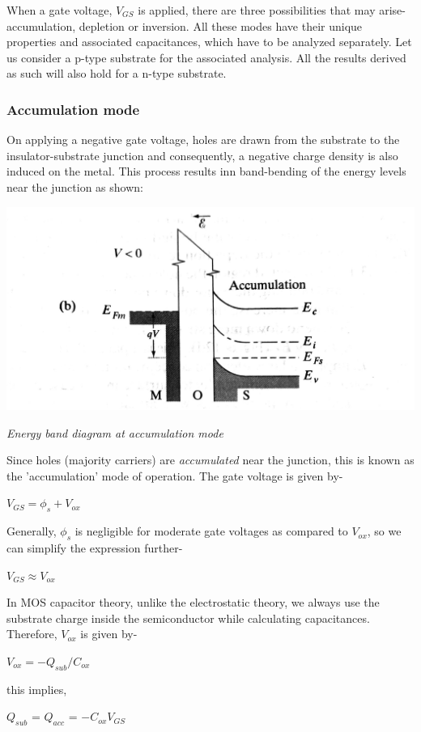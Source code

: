 \documentclass[12 pt]{article}
\begin{document}
When a gate voltage, $V_{GS}$ is applied, there are three possibilities that may arise- accumulation, depletion or inversion. All these modes have their unique properties and associated capacitances, which have to be analyzed separately. Let us consider a p-type substrate for the associated analysis. All the results derived as such will also hold for a n-type substrate. \par

\subsubsection{Accumulation mode}

On applying a negative gate voltage, holes are drawn from the substrate to the insulator-substrate junction and consequently, a negative charge density is also induced on the metal. This process results inn band-bending of the energy levels near the junction as shown: \newline

\par
\begin{center}
    \includegraphics{Accumulation_mode_1 (5).jpg}
\end{center}
\begin{center}
    \emph{\hspace{2 cm}Energy band diagram at accumulation mode\newline}
\end{center}
\par

Since holes (majority carriers) are \emph{accumulated} near the junction, this is known as the 'accumulation' mode of operation. The gate voltage is given by-
\begin{center}
    $V_{GS} = \phi_{s} + V_{ox}$
\end{center}
Generally, $\phi_{s}$ is negligible for moderate gate voltages as compared to $V_{ox}$, so we can simplify the expression further-
\begin{center}
    $ V_{GS} \approx V_{ox} $
\end{center}
In MOS capacitor theory, unlike the electrostatic theory, we always use the substrate charge inside the semiconductor while calculating capacitances. Therefore, $V_{ox}$ is given by-
\begin{center}
    $V_{ox} = -Q_{sub}/C_{ox}$
\end{center}
this implies, 
\begin{center}
    $Q_{sub}$ = $Q_{acc}$ = $-C_{ox}V_{GS}$
\end{center}
\end{document}
